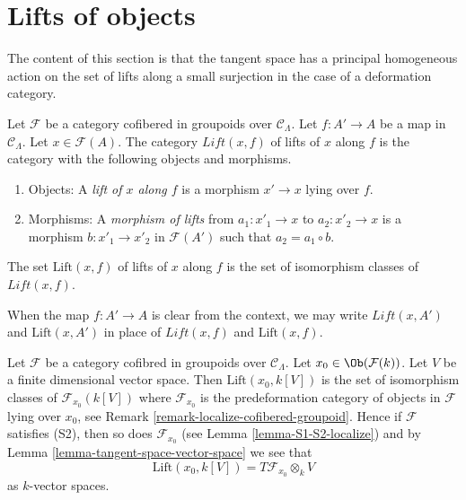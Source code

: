 \section{Lifts of objects}
\label{section-lifts}

\noindent
The content of this section is that the tangent space has a principal
homogeneous action on the set of lifts along a small surjection
in the case of a deformation category.

\begin{definition}
\label{definition-lifts}
Let $\mathcal{F}$ be a category cofibered in groupoids over
$\mathcal{C}_\Lambda$. Let $f: A' \to A$ be a map in $\mathcal{C}_\Lambda$.
Let $x \in \mathcal{F}(A)$. The category $\textit{Lift}(x, f)$ of lifts of $x$
along $f$ is the category with the following objects and
morphisms.
\begin{enumerate}
\item Objects: A {\it lift of $x$ along $f$} is a morphism $x' \to x$
lying over $f$.
\item Morphisms: A {\it morphism of lifts} from $a_1 : x'_1 \to x$ to
$a_2 : x'_2 \to x$ is a morphism $b : x'_1 \to x'_2$ in
$\mathcal{F}(A')$ such that $a_2 = a_1 \circ b$.
\end{enumerate}
The set $\text{Lift}(x, f)$ of lifts of $x$ along $f$ is the set of
isomorphism classes of $\textit{Lift}(x, f)$.
\end{definition}

\begin{remark}
\label{remark-omit-arrow}
When the map $f: A' \to A$ is clear from the context, we may write
$\textit{Lift}(x, A')$ and $\text{Lift}(x, A')$ in place of
$\textit{Lift}(x, f)$ and $\text{Lift}(x, f)$.
\end{remark}

\begin{remark}
\label{remark-tangent-space-lifting}
Let $\mathcal{F}$ be a category cofibred in groupoids over
$\mathcal{C}_\Lambda$. Let $x_0 \in \Ob(\mathcal{F}(k))$.
Let $V$ be a finite dimensional vector space.
Then $\text{Lift}(x_0, k[V])$ is the set of isomorphism classes
of $\mathcal{F}_{x_0}(k[V])$ where $\mathcal{F}_{x_0}$ is the
predeformation category of objects in $\mathcal{F}$ lying over
$x_0$, see
Remark \ref{remark-localize-cofibered-groupoid}.
Hence if $\mathcal{F}$ satisfies (S2), then so does
$\mathcal{F}_{x_0}$ (see
Lemma \ref{lemma-S1-S2-localize})
and by
Lemma \ref{lemma-tangent-space-vector-space}
we see that
$$
\text{Lift}(x_0, k[V]) = T\mathcal{F}_{x_0} \otimes_k V
$$
as $k$-vector spaces.
\end{remark}

